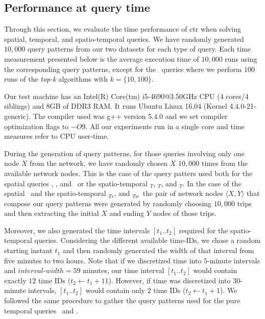 



	\subsection{Performance at query time}
	Through this section, we evaluate the time performance of \gls{ctr} when solving spatial, temporal, and spatio-temporal queries.
	We have randomly generated $10,\!000$ query patterns from our two datasets for each type of query.
	Each time measurement presented below is the average execution time of $10,\!000$ runs using the corresponding query patterns, 
	except for the \topK\ queries where we perform $100$ runs of the {\em top-k} algorithms with $k=\{10,100\}$.

	Our test machine has an Intel(R) Core(tm) i5-4690@3.50GHz CPU (4 cores/4 siblings) and 8GB of DDR3 RAM. 
	It runs Ubuntu Linux 16.04 (Kernel 4.4.0-21-generic). The compiler used was g++ version 5.4.0 and we set compiler optimization flags to $-O9$. All our experiments run in a single core and time measures refer to CPU user-time.

	During the generation of query patterns, for those queries involving only one node $X$ from the network, 
	we have randomly chosen $X$ $10,\!000$ times from the available network nodes. 
	This is the case of the query patters used both for
	the spatial queries \startX, \endX, and \loadX\ or the spatio-temporal \startX$_T$, \endX$_T$, and \loadX$_T$.
	In the case of the spatial \XtoY\ and the spatio-temporal \XtoY$_{Ts}$, and \XtoY$_{Tw}$\ the pair of
	network nodes $\langle X,Y \rangle$ that compose our
	query patterns were generated by randomly choosing
	$10,\!000$ trips and then extracting the initial $X$ and ending $Y$ nodes of those trips.

	Moreover, we also generated the time intervals $[t_1..t_2]$ required for 
	the spatio-temporal queries. Considering the different available time-IDs, we chose a random starting
	instant $t_1$ and then randomly generated the width of that interval from five minutes to two hours.
	Note that if we discretized time into $5$-minute intervals and $interval$-$width=59$ minutes, our time
	interval $[t_1..t_2]$ would contain exactly $12$ time IDs ($t_2\leftarrow t_1+11$). However, if time was
	discretized into $30$-minute intervals, $[t_1..t_2]$ would contain only $2$ time IDs ($t_2\leftarrow t_1+1$).
	We followed the same procedure to gather the query patterns used for the pure temporal queries \loadT\ and \startT.


